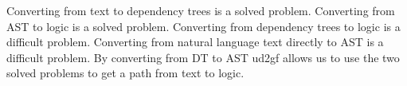 Converting from text to dependency trees is a solved problem\cite{Nivre2006,straka-etal-2016-udpipe,kanerva-etal-2020-turku}. Converting from AST to logic is a solved problem\cite{Montague1973-MONTPT-4,ranta-2004b,ranta2022end}. Converting from dependency trees to logic is a difficult problem\cite{reddy2016transforming,ranta2017explainable}. Converting from natural language text directly to AST is a difficult problem\cite{ranta-2011c,bernardy-stergios-2017,landin-1966-next-700,curry1961some,Montague1973-MONTPT-4}. By converting from DT to AST ud2gf allows us to use the two solved problems to get a path from text to logic.




%
%
%

